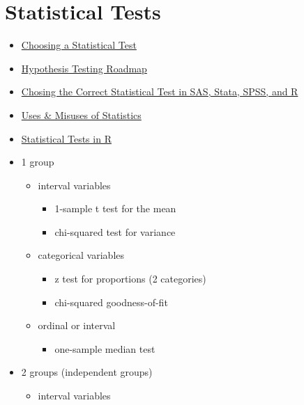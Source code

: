 \documentclass[]{book}
\providecommand{\tightlist}{%
  \setlength{\itemsep}{0pt}\setlength{\parskip}{0pt}}
\begin{document}
\hypertarget{stat}{%
\section{Statistical Tests}\label{stat}}

\begin{itemize}
\item
  \href{http://rcompanion.org/handbook/D_03.html}{Choosing a Statistical Test}
\item
  \href{http://www.bmgi.org/sites/bmgi.org/files/HTR\%20MT17.pdf}{Hypothesis Testing Roadmap}
\item
  \href{https://stats.idre.ucla.edu/other/mult-pkg/whatstat/}{Chosing the Correct Statistical Test in SAS, Stata, SPSS, and R}
\item
  \href{http://influentialpoints.com/Training/statistical_mistakes_in_research_use_and_misuse_of_statistics_in_biology.htm}{Uses \& Misuses of Statistics}
\item
  \href{http://r-statistics.co/Statistical-Tests-in-R.html}{Statistical Tests in R}
\item
  1 group

  \begin{itemize}
  \tightlist
  \item
    interval variables

    \begin{itemize}
    \tightlist
    \item
      1-sample t test for the mean
    \item
      chi-squared test for variance
    \end{itemize}
  \item
    categorical variables

    \begin{itemize}
    \tightlist
    \item
      z test for proportions (2 categories)
    \item
      chi-squared goodness-of-fit
    \end{itemize}
  \item
    ordinal or interval

    \begin{itemize}
    \tightlist
    \item
      one-sample median test
    \end{itemize}
  \end{itemize}
\item
  2 groups (independent groups)

  \begin{itemize}
  \tightlist
  \item
    interval variables


\end{itemize}
\end{itemize}
\end{document}
